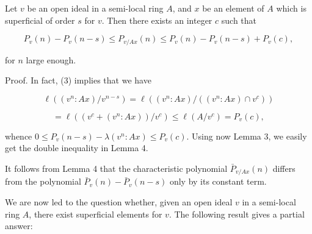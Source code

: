 Let $v$ be an open ideal in a semi-local ring $A$, and $x$ be an element of $A$ which is superficial of order $s$ for $v$. Then there exists an integer $c$ such that

$$P_v(n) - P_v(n-s) \leq P_{v/Ax}(n) \leq P_v(n) - P_v(n-s) + P_v(c),$$

for $n$ large enough.

Proof. In fact, (3) implies that we have

$$\ell((v^n:Ax)/v^{n-s}) = \ell((v^n:Ax)/((v^n:Ax) \cap v^c))$$

$$= \ell((v^c + (v^n:Ax))/v^c) \leq \ell(A/v^c) = P_v(c),$$

whence $0 \leq P_v(n-s) - \lambda(v^n:Ax) \leq P_v(c)$. Using now Lemma 3, we easily get the double inequality in Lemma 4.

It follows from Lemma 4 that the characteristic polynomial $\bar{P}_{v/Ax}(n)$ differs from the polynomial $\bar{P}_v(n) - \bar{P}_v(n-s)$ only by its constant term.

We are now led to the question whether, given an open ideal $v$ in a semi-local ring $A$, there exist superficial elements for $v$. The following result gives a partial answer: